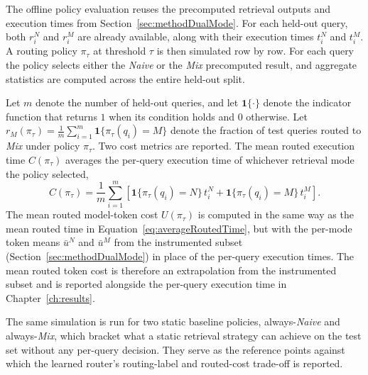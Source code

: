 \documentclass[english, bibtex]{kththesis}               %
\numberwithin{listing}{chapter}
\begin{document}
The offline policy evaluation reuses the precomputed retrieval outputs and execution times from Section~\ref{sec:methodDualMode}. For each held-out query, both \(r_i^N\) and \(r_i^M\) are already available, along with their execution times \(t_i^N\) and \(t_i^M\). A routing policy \(\pi_\tau\) at threshold \(\tau\) is then simulated row by row. For each query the policy selects either the \emph{Naive} or the \emph{Mix} precomputed result, and aggregate statistics are computed across the entire held-out split.

Let \(m\) denote the number of held-out queries, and let \(\mathbf{1}\{\cdot\}\) denote the indicator function that returns \(1\) when its condition holds and \(0\) otherwise. Let \(r_M(\pi_\tau) = \tfrac{1}{m}\sum_{i=1}^{m} \mathbf{1}\{\pi_\tau(q_i)=M\}\) denote the fraction of test queries routed to \emph{Mix} under policy \(\pi_\tau\). Two cost metrics are reported. The mean routed execution time \(C(\pi_\tau)\) averages the per-query execution time of whichever retrieval mode the policy selected,
\begin{equation}
\label{eq:averageRoutedTime}
C(\pi_\tau) =
\frac{1}{m}\sum_{i=1}^{m}
\left[
\mathbf{1}\{\pi_\tau(q_i)=N\}\,t_i^N
+ \mathbf{1}\{\pi_\tau(q_i)=M\}\,t_i^M
\right].
\end{equation}
The mean routed model-token cost \(U(\pi_\tau)\) is computed in the same way as the mean routed time in Equation~\ref{eq:averageRoutedTime}, but with the per-mode token means \(\bar{u}^N\) and \(\bar{u}^M\) from the instrumented subset (Section~\ref{sec:methodDualMode}) in place of the per-query execution times. The mean routed token cost is therefore an extrapolation from the instrumented subset and is reported alongside the per-query execution time in Chapter~\ref{ch:results}.

The same simulation is run for two static baseline policies, always-\emph{Naive} and always-\emph{Mix}, which bracket what a static retrieval strategy can achieve on the test set without any per-query decision. They serve as the reference points against which the learned router's routing-label and routed-cost trade-off is reported.
\end{document}
